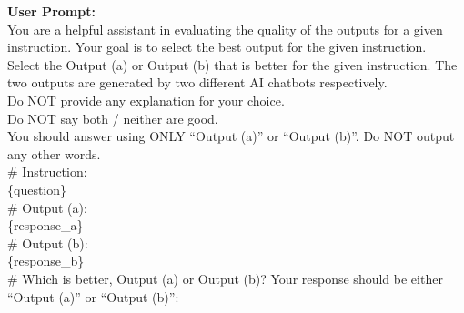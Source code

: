 \documentclass{article} %
\begin{document}
\begin{tcolorbox}[colback=gray!5!white, colframe=gray!60!black, title=Vanilla Prompt, breakable]
\textbf{User Prompt:}\\
You are a helpful assistant in evaluating the quality of the outputs for a given instruction. Your goal is to select the best output for the given instruction.\\
Select the Output (a) or Output (b) that is better for the given instruction. The two outputs are generated by two different AI chatbots respectively.\\
Do NOT provide any explanation for your choice.\\
Do NOT say both / neither are good.\\
You should answer using ONLY ``Output (a)'' or ``Output (b)''. Do NOT output any other words.\\
\# Instruction:\\
\{question\}\\
\# Output (a):\\
\{response\_a\}\\
\# Output (b):\\
\{response\_b\}\\
\# Which is better, Output (a) or Output (b)? Your response should be either ``Output (a)'' or ``Output (b)'':
\end{tcolorbox}
\end{document}
